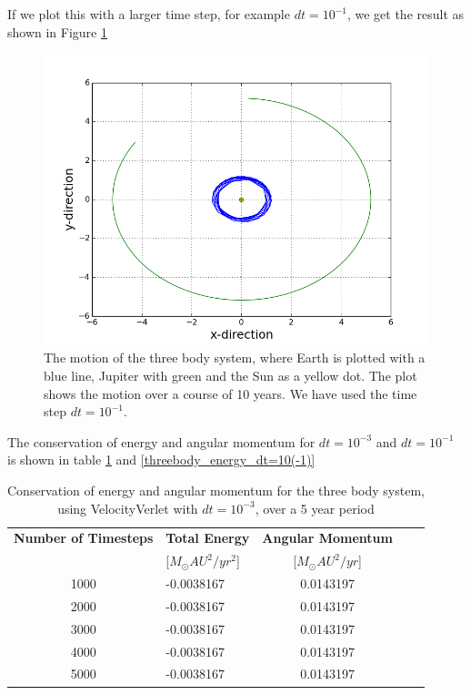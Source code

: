 \documentclass[norsk,a4paper,12pt]{article}
\begin{document}
{If we plot this with a larger time step, for example $dt = 10^{-1}$, we get the result as shown in Figure \ref{fig:Jupiter_m=10^(-3)_Earth_dt=10^(-1)}

\begin{figure} [H]
    \centering
    \includegraphics[scale= 0.6] {oppg_3e_threebody_Jupiter_m=10_(-3)_Earth_dt=10(-1)}
    \caption{The motion of the three body system, where Earth is plotted with a blue line, Jupiter with green and the Sun as a yellow dot. The plot shows the motion over a course of 10 years. We have used the time step $dt = 10^{-1}$.}
    \label{fig:Jupiter_m=10^(-3)_Earth_dt=10^(-1)}
\end{figure}

The conservation of energy and angular momentum  for $dt= 10^{-3}$ and $dt = 10^{-1}$ is shown in table \ref{threebody_energy_dt=10(-3)} and \ref{threebody_energy_dt=10(-1)}

\begin{table} [H]
\centering
\caption{Conservation of energy and angular momentum for the three body system, using VelocityVerlet with $dt=10^{-3}$, over a 5 year period}
\begin{tabularx}{\textwidth}{cXcXc} \toprule
    {\bf Number of Timesteps} & {\bf Total Energy }& {\bf Angular Momentum} \\
    &[$M_\odot AU^2/yr^2$]&[$M_\odot AU^2/yr$]\\ \hline
    1000 & -0.0038167 & 0.0143197\\ \hline
    2000 & -0.0038167 & 0.0143197\\ \hline
    3000 & -0.0038167 & 0.0143197\\ \hline
    4000 & -0.0038167 & 0.0143197\\ \hline
    5000 & -0.0038167 & 0.0143197\\ \bottomrule 
\end{tabularx}
\label{threebody_energy_dt=10(-3)}
\end{table}

}
\end{document}
